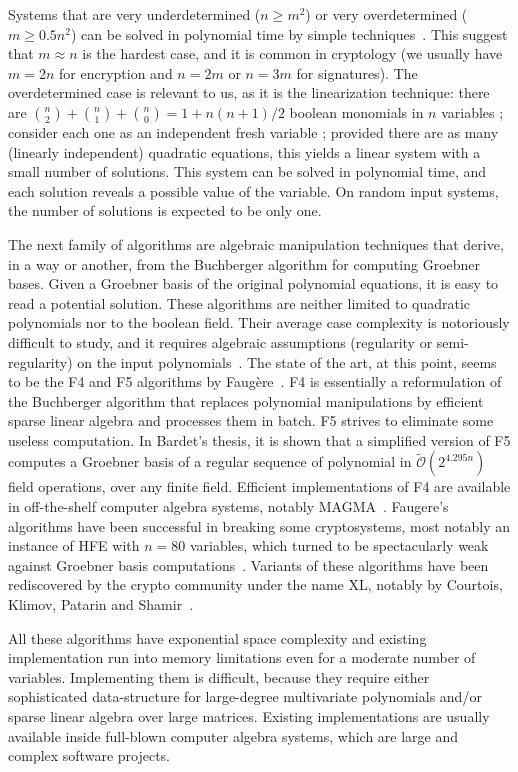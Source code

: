 \documentclass[a4paper,UKenglish,cleveref, autoref]{lipics-v2019}
\newcommand{\bigOsoft}[1]{\ensuremath{\mathcal{\tilde O}\left( #1 \right)} }
\begin{document}
Systems that are very underdetermined ($n \geq m^2$) or very overdetermined
($m \geq 0.5 n^2$) can be solved in polynomial time by simple
techniques~\cite{CourtoisGMT02}. This suggest that $m \approx n$ is the hardest
case, and it is common in cryptology (we usually have $m=2n$ for encryption and
$n = 2m$ or $n=3m$ for signatures). The overdetermined case is relevant to us, as
it is the linearization technique: there are
$\binom{n}{2} + \binom{n}{1} + \binom{n}{0} = 1 + n(n+1)/2$ boolean monomials in
$n$ variables ; consider each one as an independent fresh variable ; provided
there are as many (linearly independent) quadratic equations, this yields a
linear system with a small number of solutions. This system can be solved in
polynomial time, and each solution reveals a possible value of the variable. On
random input systems, the number of solutions is expected to be only one.

The next family of algorithms are algebraic manipulation techniques that derive,
in a way or another, from the Buchberger algorithm for computing Groebner
bases. Given a Groebner basis of the original polynomial equations, it is easy
to read a potential solution. These algorithms are neither limited to quadratic
polynomials nor to the boolean field. Their average case complexity is
notoriously difficult to study, and it requires algebraic assumptions
(regularity or semi-regularity) on the input polynomials~\cite{BardetFS15}.  The
state of the art, at this point, seems to be the F4 and F5 algorithms by
Faugère~\cite{F4,F5}. F4 is essentially a reformulation of the Buchberger
algorithm that replaces polynomial manipulations by efficient sparse linear
algebra and processes them in batch. F5 strives to eliminate some useless
computation. In Bardet's thesis, it is shown that a simplified version of F5
computes a Groebner basis of a regular sequence of polynomial in
$\bigOsoft{2^{4.295n}}$ field operations, over any finite field. Efficient
implementations of F4 are available in off-the-shelf computer algebra systems,
notably \textsf{MAGMA}~\cite{MAGMA}. Faugere's algorithms have been successful
in breaking some cryptosystems, most notably an instance of HFE with $n=80$
variables, which turned to be spectacularly weak against Groebner basis
computations~\cite{FaugereJ03}. Variants of these algorithms have been
rediscovered by the crypto community under the name XL, notably by Courtois,
Klimov, Patarin and Shamir~\cite{CourtoisKPS00}.

All these algorithms have exponential space complexity and existing
implementation run into memory limitations even for a moderate number of
variables. Implementing them is difficult, because they require either
sophisticated data-structure for large-degree multivariate polynomials and/or
sparse linear algebra over large matrices. Existing implementations are usually
available inside full-blown computer algebra systems, which are large and
complex software projects.
\end{document}
